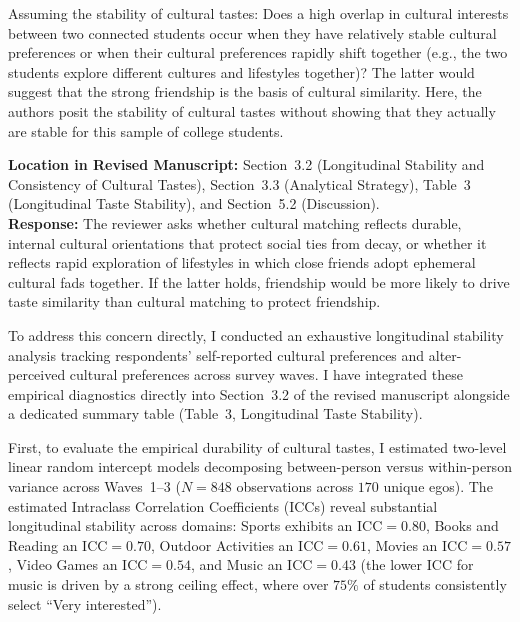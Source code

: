 \documentclass[11pt]{article}
\begin{document}
\begin{reviewercomment}
Assuming the stability of cultural tastes: Does a high overlap in cultural interests between two connected students occur when they have relatively stable cultural preferences or when their cultural preferences rapidly shift together (e.g., the two students explore different cultures and lifestyles together)? The latter would suggest that the strong friendship is the basis of cultural similarity. Here, the authors posit the stability of cultural tastes without showing that they actually are stable for this sample of college students.
\end{reviewercomment}

\noindent\textbf{Location in Revised Manuscript:} Section~3.2 (Longitudinal Stability and Consistency of Cultural Tastes), Section~3.3 (Analytical Strategy), Table~3 (Longitudinal Taste Stability), and Section~5.2 (Discussion).\\[4pt]
\textbf{Response:} The reviewer asks whether cultural matching reflects durable, internal cultural orientations that protect social ties from decay, or whether it reflects rapid exploration of lifestyles in which close friends adopt ephemeral cultural fads together. If the latter holds, friendship would be more likely to drive taste similarity than cultural matching to protect friendship.

To address this concern directly, I conducted an exhaustive longitudinal stability analysis tracking respondents' self-reported cultural preferences and alter-perceived cultural preferences across survey waves. I have integrated these empirical diagnostics directly into Section~3.2 of the revised manuscript alongside a dedicated summary table (Table~3, Longitudinal Taste Stability).

First, to evaluate the empirical durability of cultural tastes, I estimated two-level linear random intercept models decomposing between-person versus within-person variance across Waves~1--3 ($N = 848$ observations across $170$ unique egos). The estimated Intraclass Correlation Coefficients (ICCs) reveal substantial longitudinal stability across domains: Sports exhibits an $\text{ICC} = 0.80$, Books and Reading an $\text{ICC} = 0.70$, Outdoor Activities an $\text{ICC} = 0.61$, Movies an $\text{ICC} = 0.57$, Video Games an $\text{ICC} = 0.54$, and Music an $\text{ICC} = 0.43$ (the lower ICC for music is driven by a strong ceiling effect, where over $75\%$ of students consistently select ``Very interested'').
\end{document}
